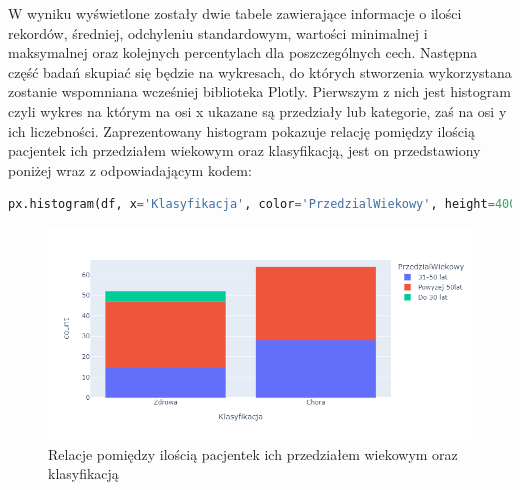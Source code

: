 \documentclass[a4paper,12pt,oneside]{book}
\begin{document}
\begin{center}
\end{center}

W wyniku wyświetlone zostały dwie tabele zawierające informacje o ilości rekordów, średniej, odchyleniu standardowym, wartości minimalnej i maksymalnej oraz kolejnych percentylach dla poszczególnych cech. Następna część badań skupiać się będzie na wykresach, do których stworzenia wykorzystana zostanie wspomniana wcześniej biblioteka Plotly. Pierwszym z nich jest histogram czyli wykres na którym na osi x ukazane są przedziały lub kategorie, zaś na osi y ich liczebności. Zaprezentowany histogram pokazuje relację pomiędzy ilością pacjentek ich przedziałem wiekowym oraz klasyfikacją, jest on przedstawiony poniżej wraz z odpowiadającym kodem: 

\begin{lstlisting}[language=Python, caption=Tworzenie histogramu]
px.histogram(df, x='Klasyfikacja', color='PrzedzialWiekowy', height=400, width=800)
\end{lstlisting}

\begin{figure}[H]
\centering
\includegraphics[scale=0.3]{pxhistoshow.png}
\caption{Relacje pomiędzy ilością pacjentek ich przedziałem wiekowym oraz klasyfikacją }
\end{figure}
\end{document}
